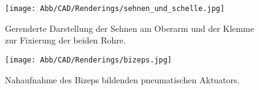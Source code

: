 		\begin{figure}[h]
			\centering
			\texttt{[image: Abb/CAD/Renderings/sehnen\_und\_schelle.jpg]}
			\caption[Gerenderte Darstellung der Sehnen und Sattelklemme]{Gerenderte Darstellung der Sehnen am Oberarm und der Klemme zur Fixierung der beiden Rohre.}%
			\label{fig:rendering sehnen und schellen}
		\end{figure}

		\begin{figure}[h]
			\centering
			\texttt{[image: Abb/CAD/Renderings/bizeps.jpg]}
			\caption[Nahaufnahme des Bizeps bildenden pneumatischen Aktuators]{Nahaufnahme des Bizeps bildenden pneumatischen Aktuators.}%
			\label{fig:rendering bizeps}
		\end{figure}
